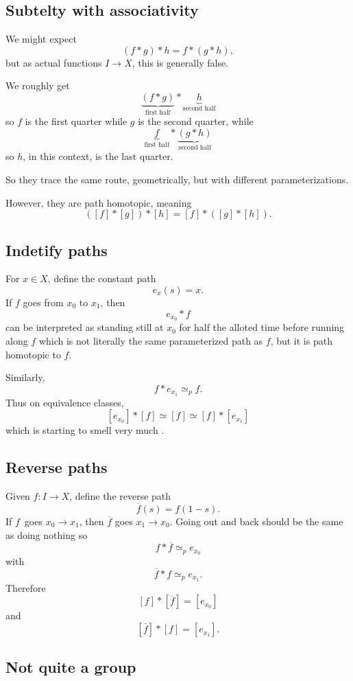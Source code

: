 \documentclass[11pt]{article}
\begin{document}
\subsection{Subtelty with associativity}

We might expect 
\[
    (f*g) * h = f * (g * h), 
\]
but as actual functions $I \to X$, this is generally 
false. 

We roughly get 
\[
    \underbrace{(f*g)}_{\text{first half}} * 
    \underbrace{h}_{\text{second half}}
\]
so $f$ is the first quarter while $g$ is the second quarter, while 
\[
    \underbrace{f}_{\text{first half}} * 
    \underbrace{(g * h)}_{\text{second half}}
\]
so $h$, in this context, is the last quarter. 

So they trace the same route, geometrically, but with 
different parameterizations. 

However, they are path homotopic, meaning 
\[
    ([f] * [g]) * [h] = [f] * ([g] * [h]).
\]

\subsection{Indetify paths}

For $x\in X$, define the constant path 
\[
    e_x(s) = x. 
\]
If $f$ goes from $x_0$ to $x_1$, then 
\[
    e_{x_0} * f
\]
can be interpreted as standing still at 
$x_0$ for half the alloted time before running along 
$f$ which is not literally the same parameterized path as 
$f$, but it is path homotopic to $f$. 

Similarly, 
\[
    f * e_{x_1} \simeq_p f. 
\]
Thus on equivalence classes, 
\[
    [e_{x_0}] * [f] \simeq [f] 
    \simeq [f] * [e_{x_1}]
\]
which is starting to smell very much . 

\subsection{Reverse paths}

Given $f : I \to X$, define the reverse path 
\[
    \overline f(s) = f(1-s). 
\]
If $f$ goes $x_0 \to x_1$, then 
$\overline f$ goes $x_1 \to x_0$. Going out and 
back should be the same as doing nothing so 
\[
    f * \overline f \simeq_p e_{x_0}
\]
with 
\[
    \overline f * f \simeq_p e_{x_1}.
\]
Therefore 
\[
    [f] * [\overline f] = [e_{x_0}] 
\]
and 
\[
    [\overline f] * [f] = [e_{x_1}].
\]

\subsection{Not quite a group}
\end{document}
